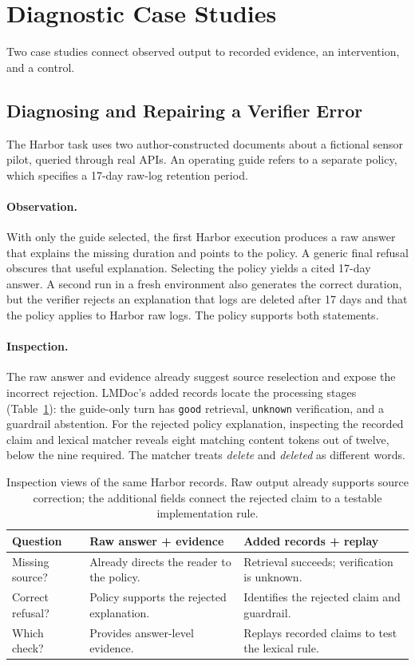 \section{Diagnostic Case Studies}
\label{sec:case}
Two case studies connect observed output to recorded evidence, an intervention, and a control.

\subsection{Diagnosing and Repairing a Verifier Error}
The Harbor task uses two author-constructed documents about a fictional sensor pilot, queried through real APIs. An operating guide refers to a separate policy, which specifies a 17-day raw-log retention period.

\paragraph{Observation.}
With only the guide selected, the first Harbor execution produces a raw answer that explains the missing duration and points to the policy. A generic final refusal obscures that useful explanation. Selecting the policy yields a cited 17-day answer. A second run in a fresh environment also generates the correct duration, but the verifier rejects an explanation that logs are deleted after 17 days and that the policy applies to Harbor raw logs. The policy supports both statements.

\paragraph{Inspection.}
The raw answer and evidence already suggest source reselection and expose the incorrect rejection. LMDoc's added records locate the processing stages (Table~\ref{tab:boundary}): the guide-only turn has \texttt{good} retrieval, \texttt{unknown} verification, and a guardrail abstention. For the rejected policy explanation, inspecting the recorded claim and lexical matcher reveals eight matching content tokens out of twelve, below the nine required. The matcher treats \emph{delete} and \emph{deleted} as different words.

\begin{table}[t]
\small
\centering
\begin{tabularx}{\columnwidth}{@{}p{}XX@{}}
\toprule
Question & Raw answer + evidence & Added records + replay \\
\midrule
Missing source? & Already directs the reader to the policy. & Retrieval succeeds; verification is unknown. \\
Correct refusal? & Policy supports the rejected explanation. & Identifies the rejected claim and guardrail. \\
Which check? & Provides answer-level evidence. & Replays recorded claims to test the lexical rule. \\
\bottomrule
\end{tabularx}
\caption{Inspection views of the same Harbor records. Raw output already supports source correction; the additional fields connect the rejected claim to a testable implementation rule.}
\label{tab:boundary}
\end{table}

